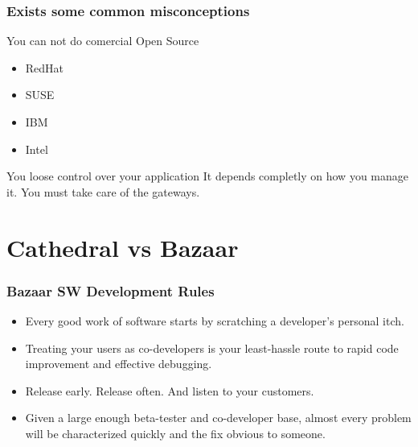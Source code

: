 \documentclass[hyperref={pdfpagelabels=false},xcolor=pst,pdf,fragile]{beamer}
\begin{document}
\begin{frame}
  \frametitle{Exists some common misconceptions}

  \begin{block}{You can not do comercial Open Source}
	\begin{itemize}
	  \item RedHat
	  \item SUSE
	  \item IBM
	  \item Intel
	\end{itemize}
  \end{block}

  \begin{block}{You loose control over your application}
	It depends completly on how you manage it. You must take care of the
	gateways.
  \end{block}

\end{frame}

\section{Cathedral vs Bazaar}


\begin{frame}
  \frametitle{Bazaar SW Development Rules}

  \begin{itemize}
	\item Every good work of software starts by scratching a developer's
	  personal itch.

	\item Treating your users as co-developers is your least-hassle route
	  to rapid code improvement and effective debugging.

	\item Release early. Release often. And listen to your customers.

	\item Given a large enough beta-tester and co-developer base, almost
	  every problem will be characterized quickly and the fix obvious to
	  someone.

  \end{itemize}

\end{frame}
\end{document}
